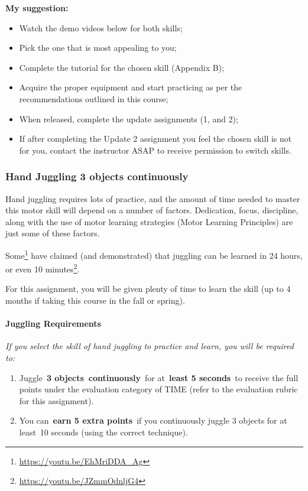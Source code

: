 \documentclass[
  letterpaper,
  DIV=11,
  numbers=noendperiod]{scrartcl}
\let\oldparagraph\paragraph
\renewcommand{\paragraph}[1]{\oldparagraph{#1}\mbox{}}
\providecommand{\tightlist}{%
  \setlength{\itemsep}{0pt}\setlength{\parskip}{0pt}}\usepackage{longtable,booktabs,array}
\DeclareRobustCommand{\href}[2]{#2\footnote{\url{#1}}}
\begin{document}
\textbf{My suggestion:}

\begin{itemize}
\tightlist
\item
  Watch the demo videos below for both skills;
\item
  Pick the one that is most appealing to you;
\item
  Complete the tutorial for the chosen skill (Appendix B);
\item
  Acquire the proper equipment and start practicing as per the
  recommendations outlined in this course;
\item
  When released, complete the update assignments (1, and 2);
\item
  If after completing the Update 2 assignment you feel the chosen skill
  is not for you, contact the instructor ASAP to receive permission to
  switch skills.
\end{itemize}

\hypertarget{hand-juggling-3-objects-continuously}{%
\subsubsection{Hand Juggling 3 objects
continuously}\label{hand-juggling-3-objects-continuously}}

Hand juggling requires lots of practice, and the amount of time needed
to master this motor skill will depend on a number of factors.
Dedication, focus, discipline, along with the use of motor learning
strategies (Motor Learning Principles) are just some of these factors.

\href{https://youtu.be/EhMriDDA_Ag}{Some} have claimed (and
demonstrated) that juggling can be learned in 24 hours, or even
\href{https://youtu.be/JZmmOdnljG4}{10 minutes}.

For this assignment, you will be given plenty of time to learn the skill
(up to 4 months if taking this course in the fall or spring).

\hypertarget{juggling-requirements}{%
\paragraph{Juggling Requirements}\label{juggling-requirements}}

\emph{If you select the skill of hand juggling to practice and learn,
you will be required to:}

\begin{enumerate}
\def\labelenumi{\arabic{enumi}.}
\item
  Juggle~\textbf{3 objects~continuously}~for at~\textbf{least 5
  seconds}~to receive the full points under the evaluation category of
  TIME (refer to the evaluation rubric for this assignment).~
\item
  You can~\textbf{earn 5 extra points}~if you continuously juggle 3
  objects for at least~10 seconds (using the correct technique).~
\end{enumerate}
\end{document}
